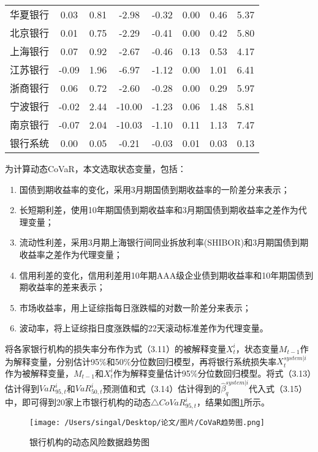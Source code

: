 \documentclass[lang=cn]{elegantpaper}
\begin{document}
\begin{longtable}{cccccccc}
    华夏银行 & 0.03  & 0.81 & -2.98  & -0.32    & 0.00    & 0.46     & 5.37 \\
    北京银行 & 0.01  & 0.75 & -2.29  & -0.41    & 0.00    & 0.42     & 5.80 \\
    上海银行 & 0.07  & 0.92 & -2.67  & -0.46    & 0.13    & 0.53     & 4.17 \\
    江苏银行 & -0.09 & 1.96 & -6.97  & -1.12    & 0.00    & 1.01     & 6.41 \\
    浙商银行 & 0.06  & 0.72 & -2.60  & -0.28    & 0.00    & 0.29     & 5.97 \\
    宁波银行 & -0.02 & 2.44 & -10.00 & -1.23    & 0.06    & 1.48     & 5.81 \\
    南京银行 & -0.07 & 2.04 & -10.03 & -1.10    & 0.11    & 1.13     & 7.47 \\
    银行系统 & 0.00  & 0.05 & -0.21  & -0.03    & 0.01    & 0.03     & 0.13 \\ \bottomrule
\end{longtable}

为计算动态CoVaR，本文选取状态变量，包括：
\begin{enumerate}
    \item 国债到期收益率的变化，采用3月期国债到期收益率的一阶差分来表示；
    \item 长短期利差，使用10年期国债到期收益率和3月期国债到期收益率之差作为代理变量；
    \item 流动性利差，采用3月期上海银行间同业拆放利率(SHIBOR)和3月期国债到期收益率之差作为代理变量；
    \item 信用利差的变化，信用利差用10年期AAA级企业债到期收益率和10年期国债到期收益率的差来表示；
    \item 市场收益率，用上证综指每日涨跌幅的对数一阶差分来表示；
    \item 波动率，将上证综指日度涨跌幅的22天滚动标准差作为代理变量。
\end{enumerate}

将各家银行机构的损失率分布作为式（3.11）的被解释变量$X_t^i$，状态变量$M_{t-1}$作为解释变量，分别估计95\%和50\%分位数回归模型，再将银行系统损失率$X_t^{system|i}$作为被解释变量，$M_{t-1}$和$X_t^i$作为解释变量估计95\%分位数回归模型。将式（3.13）估计得到$VaR_{95,t}^i$和$VaR_{50,t}^i$预测值和式（3.14）估计得到的$\hat\beta_q^{system|i}$代入式（3.15）中，即可得到20家上市银行机构的动态$\bigtriangleup CoVaR_{95,t}^i$，结果如图\ref{图3}所示。
\begin{figure}[htb]
    \centering
    \texttt{[image: /Users/singal/Desktop/论文/图片/CoVaR趋势图.png]}
    \caption{银行机构的动态风险数据趋势图}
    \label{图3}
\end{figure}
\end{document}
